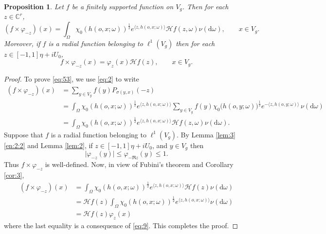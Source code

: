 \documentclass[11pt]{amsart}
\newcommand{\CC}{\mathbb{C}}
\newcommand{\calH}{\mathcal{H}}
\newcommand{\vphi}{\varphi}
\newcommand{\sprod}[2]{\langle {#1}, {#2} \rangle}
\theoremstyle{plain}
\newtheorem{proposition}[theorem]{Proposition}
\theoremstyle{definition}
\numberwithin{equation}{section}
\begin{document}
\begin{proposition}
	\label{prop:2}
	Let $f$ be a finitely supported function on $V_g$. Then for each $z \in \CC^r$,
	\begin{equation}
		\label{eq:53}
		(f \times \vphi_{-z})(x)
		=
		\int_{\Omega} \chi_0(h(o,x;\omega))^{\frac{1}{2}}e^{\sprod{z}{h(o, x; \omega)}}\calH f(z, \omega)
		\nu(\mathrm{d}\omega), \qquad x \in V_g.
	\end{equation}
	Moreover, if $f$ is a radial function belonging to $\ell^1(V_g)$ then for each $z \in [-1, 1]\eta + iU_0$,
	\[
		f \times \vphi_{-z} (x) = \vphi_z (x) \calH f(z), \qquad x \in V_g.
	\]
\end{proposition}
\begin{proof}
	To prove \eqref{eq:53}, we use \eqref{eq:2} to write
	\begin{align*}
		(f \times \vphi_{-z})(x)
		&=
		\sum_{y \in V_g} f(y) P_{\sigma(y, x)}(-z) \\
		&=
		\int_{\Omega} \chi_0(h(o,x;\omega))^{\frac{1}{2}} e^{\sprod{z}{h(o, x; \omega)}} 
		\sum_{y\in V_g} f(y)  \chi_0\big(h(o, y; \omega)\big)^\frac{1}{2} e^{-\sprod{z}{h(o, y; \omega)}} \, 
		\nu(\mathrm{d}\omega)\\
		&=\int_{\Omega} \chi_0(h(o,x;\omega))^{\frac{1}{2}}e^{\sprod{z}{h(o, x; \omega)}}\calH f(z, \omega)
		\nu(\mathrm{d}\omega).
	\end{align*}
	Suppose that $f$ is a radial function belonging to $\ell^1(V_g)$. By Lemma \ref{lem:3}\eqref{en:2:2} and Lemma \ref{lem:2}, 
	if $z \in [-1, 1] \eta + iU_0$, and $y \in V_g$ then
	\[
		\big| \vphi_{-z}(y) \big| \leqslant \vphi_{-\Re z}(y) \leqslant 1.
	\]
	Thus $f \times \vphi_{-z}$ is well-defined. Now, in view of Fubini's theorem and Corollary \ref{cor:3},
	\begin{align*}
		(f \times \vphi_{-z})(x) 
		&= 
		\int_{\Omega} \chi_0(h(o,x;\omega))^{\frac{1}{2}}e^{\sprod{z}{h(o, x; \omega)}}\calH f(z) \nu(\mathrm{d}\omega) \\
		&=
		\calH f(z) \int_{\Omega} \chi_0(h(o,x;\omega))^{\frac{1}{2}} e^{\sprod{z}{h(o, x; \omega)}} \nu(\mathrm{d}\omega) \\
		&=
		\calH f(z) \vphi_z(x)
	\end{align*}
	where the last equality is a consequence of \eqref{eq:9}. This completes the proof.
\end{proof}
\end{document}
